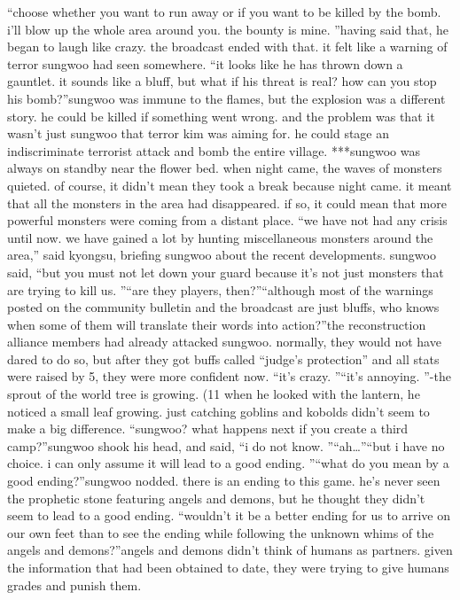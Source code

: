 “choose whether you want to run away or if you want to be killed by the bomb.
 i’ll blow up the whole area around you.
 the bounty is mine.
”having said that, he began to laugh like crazy.
 the broadcast ended with that.
 it felt like a warning of terror sungwoo had seen somewhere.
“it looks like he has thrown down a gauntlet.
 it sounds like a bluff, but what if his threat is real? how can you stop his bomb?”sungwoo was immune to the flames, but the explosion was a different story.
he could be killed if something went wrong.
and the problem was that it wasn’t just sungwoo that terror kim was aiming for.
 he could stage an indiscriminate terrorist attack and bomb the entire village.
***sungwoo was always on standby near the flower bed.
when night came, the waves of monsters quieted.
 of course, it didn’t mean they took a break because night came.
 it meant that all the monsters in the area had disappeared.
if so, it could mean that more powerful monsters were coming from a distant place.
“we have not had any crisis until now.
 we have gained a lot by hunting miscellaneous monsters around the area,” said kyongsu, briefing sungwoo about the recent developments.
sungwoo said, “but you must not let down your guard because it’s not just monsters that are trying to kill us.
”“are they players, then?”“although most of the warnings posted on the community bulletin and the broadcast are just bluffs, who knows when some of them will translate their words into action?”the reconstruction alliance members had already attacked sungwoo.
 normally, they would not have dared to do so, but after they got buffs called “judge’s protection” and all stats were raised by 5, they were more confident now.
“it’s crazy.
”“it’s annoying.
”-the sprout of the world tree is growing.
 (11%
when he looked with the lantern, he noticed a small leaf growing.
 just catching goblins and kobolds didn’t seem to make a big difference.
“sungwoo? what happens next if you create a third camp?”sungwoo shook his head, and said, “i do not know.
”“ah…”“but i have no choice.
 i can only assume it will lead to a good ending.
”“what do you mean by a good ending?”sungwoo nodded.
 there is an ending to this game.
 he’s never seen the prophetic stone featuring angels and demons, but he thought they didn’t seem to lead to a good ending.
“wouldn’t it be a better ending for us to arrive on our own feet than to see the ending while following the unknown whims of the angels and demons?”angels and demons didn’t think of humans as partners.
 given the information that had been obtained to date, they were trying to give humans grades and punish them.
